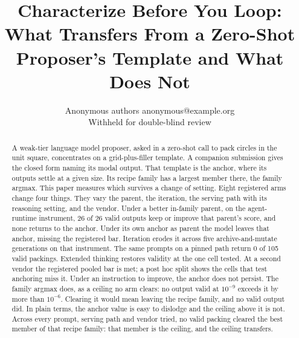 \documentclass[10pt]{article}
\title{Characterize Before You Loop: What Transfers From a Zero-Shot
Proposer's Template and What Does Not}
\author{\name Anonymous authors \email anonymous@example.org \\
      \addr Withheld for double-blind review}
\begin{document}
\maketitle

\begin{abstract}
A weak-tier language model proposer, asked in a zero-shot call to pack circles in the unit
square, concentrates on a grid-plus-filler template. A companion submission gives the closed
form naming its modal output. That template is the anchor, where its outputs settle at a
given size. Its recipe family has a largest member there, the family argmax. This
paper measures which survives a change of setting.
Eight registered arms change four things. They vary the parent, the
iteration, the serving path with its reasoning setting, and the vendor. Under a better
in-family parent, on the agent-runtime instrument, 26 of 26 valid outputs keep or improve that
parent's score, and none returns to the anchor. Under its own anchor as parent the model leaves that anchor,
missing the registered bar. Iteration erodes it across five archive-and-mutate
generations on that instrument. The same prompts on a pinned
path return 0 of 105 valid packings. Extended thinking restores validity at the one cell
tested. At a second vendor the registered pooled bar is met; a post hoc split shows the cells
that test anchoring miss it. Under an instruction to improve, the anchor does not persist. The family argmax does, as
a ceiling no arm clears: no output valid at $10^{-9}$ exceeds it by more than $10^{-6}$.
Clearing it would mean leaving the recipe family,
and no valid output did. In plain terms, the anchor value is easy to dislodge and the
ceiling above it is not. Across every prompt, serving path and vendor tried, no valid packing
cleared the best member of that recipe family: that member is the ceiling, and the ceiling
transfers.
\end{abstract}













\end{document}
